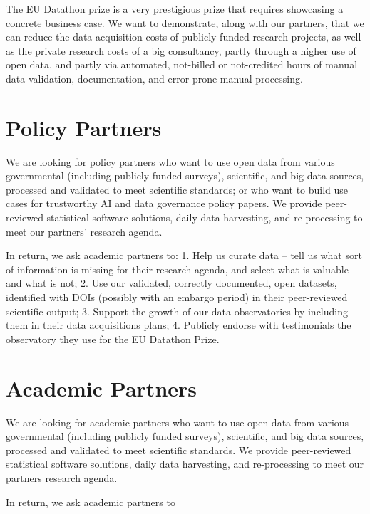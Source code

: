 \documentclass[
  a4paper,
  openany, a4paper, oneside]{book}
\begin{document}
The EU Datathon prize is a very prestigious prize that requires showcasing a concrete business case. We want to demonstrate, along with our partners, that we can reduce the data acquisition costs of publicly-funded research projects, as well as the private research costs of a big consultancy, partly through a higher use of open data, and partly via automated, not-billed or not-credited hours of manual data validation, documentation, and error-prone manual processing.

\hypertarget{policy-partners}{%
\section{Policy Partners}\label{policy-partners}}

We are looking for policy partners who want to use open data from various governmental (including publicly funded surveys), scientific, and big data sources, processed and validated to meet scientific standards; or who want to build use cases for trustworthy AI and data governance policy papers. We provide peer-reviewed statistical software solutions, daily data harvesting, and re-processing to meet our partners' research agenda.

In return, we ask academic partners to:
1. Help us curate data -- tell us what sort of information is missing for their research agenda, and select what is valuable and what is not;
2. Use our validated, correctly documented, open datasets, identified with DOIs (possibly with an embargo period) in their peer-reviewed scientific output;
3. Support the growth of our data observatories by including them in their data acquisitions plans;
4. Publicly endorse with testimonials the observatory they use for the EU Datathon Prize.

\hypertarget{academic-partners}{%
\section{Academic Partners}\label{academic-partners}}

We are looking for academic partners who want to use open data from various governmental (including publicly funded surveys), scientific, and big data sources, processed and validated to meet scientific standards. We provide peer-reviewed statistical software solutions, daily data harvesting, and re-processing to meet our partners research agenda.

In return, we ask academic partners to
\end{document}
